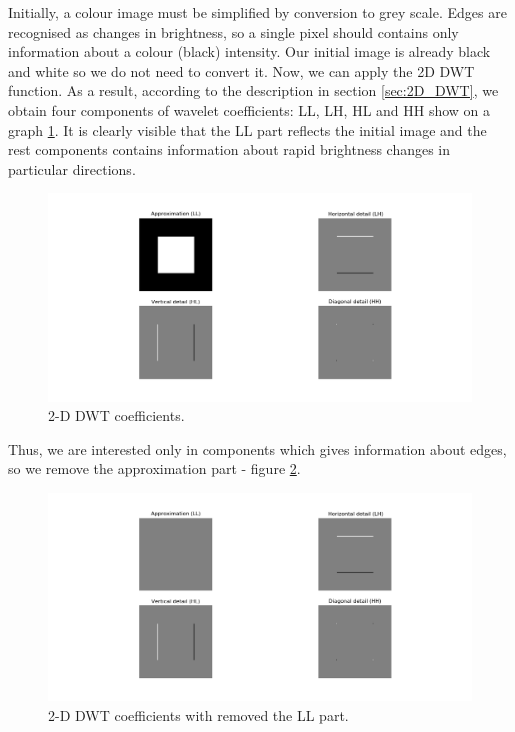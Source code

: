 Initially, a colour image must be simplified by conversion to grey scale. Edges are recognised as changes in brightness, so a single pixel should contains only information about a colour (black) intensity. Our initial image is already black and white so we do not need to convert it. Now, we can apply the 2D DWT function. As a result, according to the description in section \ref{sec:2D_DWT}, we obtain four components of wavelet coefficients: LL, LH, HL and HH show on a graph \ref{fig:square_coeffs}. It is clearly visible that the LL part reflects the initial image and the rest components contains information about rapid brightness changes in particular directions. 

\begin{figure}[h]
	\centering
	\includegraphics[width=\textwidth]{graphs/square_db2_coeffs.png}
	\caption{2-D DWT coefficients.}
	\label{fig:square_coeffs}
\end{figure}

Thus, we are interested only in components which gives information about edges, so we remove the approximation part - figure \ref{fig:square_coeffs_d}.

\begin{figure}[h]
	\centering
	\includegraphics[width=\textwidth]{graphs/square_db2_coeffs_d.png}
	\caption{2-D DWT coefficients with removed the LL part.}
	\label{fig:square_coeffs_d}
\end{figure}

